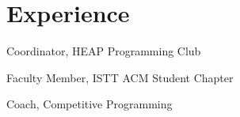 \documentclass[]{deedy-resume-openfont}
\begin{document}
\begin{minipage}[t]{0.66\textwidth} 
	
	
\section{Experience}

\vspace{\topsep} %
\begin{tightemize}
	\item Coordinator, HEAP Programming Club
	\item Faculty Member, ISTT ACM Student Chapter
	\item Coach, Competitive Programming
\end{tightemize}
\sectionsep	


%
%
%
%




\end{minipage}
\end{document}

